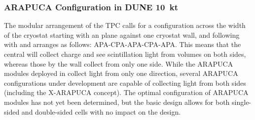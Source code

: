 %
 
\subsubsection{ARAPUCA Configuration in DUNE \SI{10}{kt} }
\label{sssec:arapuca-dune}

The modular arrangement of the  TPC calls for a configuration across the width of the cryostat starting with an  plane against one cryostat wall, and following with  and  arranges as follows:  APA-CPA-APA-CPA-APA. This means that the central  will collect charge and see scintillation light from \lar volumes on both sides, whereas those by the wall collect from only one side.  
While the ARAPUCA modules deployed in  collect light from only one direction, several ARAPUCA configurations under development are capable of collecting light from both sides (including the X-ARAPUCA concept).
The optimal configuration of ARAPUCA modules has not yet been determined, but the basic design allows for both single-sided and double-sided cells with no impact on the  design.


